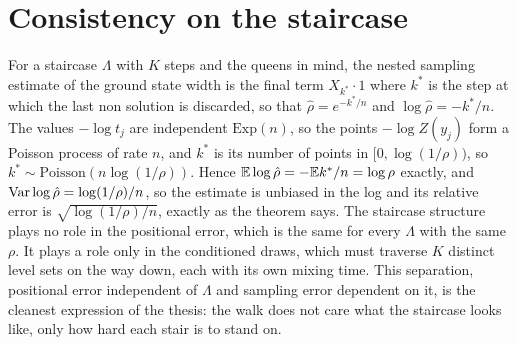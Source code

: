 \section{Consistency on the staircase}

For a staircase $\Lambda$ with $K$ steps and the queens in mind, the nested sampling estimate of the ground state width is the final term $X_{k^*} \cdot 1$ where $k^*$ is the step at which the last non solution is discarded, so that $\hat\rho = e^{-k^*/n}$ and $\log \hat\rho = -k^*/n$. The values $-\log t_j$ are independent $\mathrm{Exp}(n)$, so the points $-\log Z(y_j)$ form a Poisson process of rate $n$, and $k^*$ is its number of points in $[0, \log(1/\rho))$, so $k^* \sim \mathrm{Poisson}(n \log(1/\rho))$. Hence $\mathbb{E} \log \hat\rho = -\mathbb{E} k^*/n = \log \rho$ exactly, and $\operatorname{Var} \log\hat\rho = \log(1/\rho)/n$, so the estimate is unbiased in the log and its relative error is $\sqrt{\log(1/\rho)/n}$, exactly as the theorem says. The staircase structure plays no role in the positional error, which is the same for every $\Lambda$ with the same $\rho$. It plays a role only in the conditioned draws, which must traverse $K$ distinct level sets on the way down, each with its own mixing time. This separation, positional error independent of $\Lambda$ and sampling error dependent on it, is the cleanest expression of the thesis: the walk does not care what the staircase looks like, only how hard each stair is to stand on.
